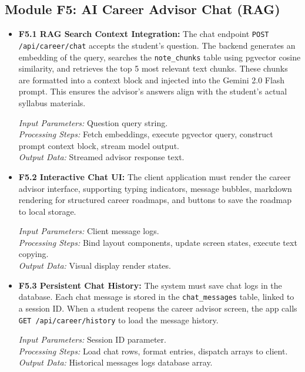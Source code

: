 \documentclass[12,Times new Roman,a4paper]{report}
\begin{document}
\subsection{Module F5: AI Career Advisor Chat (RAG)}
\begin{itemize}
    \item \textbf{F5.1 RAG Search Context Integration:} The chat endpoint \texttt{POST /api/career/chat} accepts the student's question. The backend generates an embedding of the query, searches the \texttt{note\_chunks} table using pgvector cosine similarity, and retrieves the top 5 most relevant text chunks. These chunks are formatted into a context block and injected into the Gemini 2.0 Flash prompt. This ensures the advisor's answers align with the student's actual syllabus materials.
    
    \textit{Input Parameters:} Question query string. \\
    \textit{Processing Steps:} Fetch embeddings, execute pgvector query, construct prompt context block, stream model output. \\
    \textit{Output Data:} Streamed advisor response text.
    
    \item \textbf{F5.2 Interactive Chat UI:} The client application must render the career advisor interface, supporting typing indicators, message bubbles, markdown rendering for structured career roadmaps, and buttons to save the roadmap to local storage.
    
    \textit{Input Parameters:} Client message logs. \\
    \textit{Processing Steps:} Bind layout components, update screen states, execute text copying. \\
    \textit{Output Data:} Visual display render states.
    
    \item \textbf{F5.3 Persistent Chat History:} The system must save chat logs in the database. Each chat message is stored in the \texttt{chat\_messages} table, linked to a session ID. When a student reopens the career advisor screen, the app calls \texttt{GET /api/career/history} to load the message history.
    
    \textit{Input Parameters:} Session ID parameter. \\
    \textit{Processing Steps:} Load chat rows, format entries, dispatch arrays to client. \\
    \textit{Output Data:} Historical messages logs database array.
\end{itemize}
\end{document}

